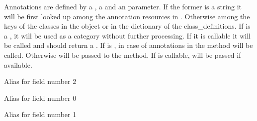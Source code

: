 \documentclass[letterpaper,10pt,english]{sphinxmanual}
\begin{document}
\begin{fulllineitems}
\label{\detokenize{reference:pypath.annot_formats.AnnotDef}}
Annotations are defined by a , a  and an 
parameter. If the former is a string it will be first looked up among
the annotation resources in . Otherwise among the
keys of the classes in the  object or in the
dictionary of the class\_definitions. If  is a , it
will be used as a category without further processing. If it is
callable it will be called and should return a . If
 is , in case of annotations in
 the  method will be called. Otherwise
 will be passed to the  method. If 
is callable,  will be passed if available.

\begin{fulllineitems}
\label{\detokenize{reference:pypath.annot_formats.AnnotDef.args}}
Alias for field number 2

\end{fulllineitems}


\begin{fulllineitems}
\label{\detokenize{reference:pypath.annot_formats.AnnotDef.name}}
Alias for field number 0

\end{fulllineitems}


\begin{fulllineitems}
\label{\detokenize{reference:pypath.annot_formats.AnnotDef.source}}
Alias for field number 1

\end{fulllineitems}


\end{fulllineitems}
\end{document}
